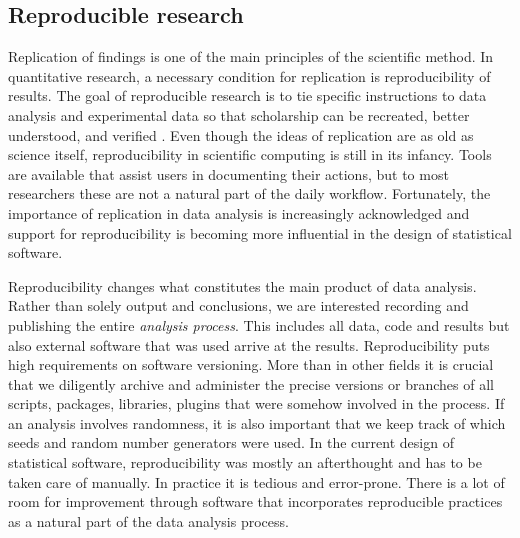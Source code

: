 \subsection{Reproducible research}

Replication of findings is one of the main principles of the scientific method. In quantitative research, a necessary condition for replication is reproducibility of results. The goal of reproducible research is to tie specific instructions to data analysis and experimental data so that scholarship can be recreated, better understood, and verified \citep{cranRR}. Even though the ideas of replication are as old as science itself, reproducibility in scientific computing is still in its infancy. Tools are available that assist users in documenting their actions, but to most researchers these are not a natural part of the daily workflow. Fortunately, the importance of replication in data analysis is increasingly acknowledged and support for reproducibility is becoming more influential in the design of statistical software.

Reproducibility changes what constitutes the main product of data analysis. Rather than solely output and conclusions, we are interested recording and publishing the entire \emph{analysis process}. This includes all data, code and results but also external software that was used arrive at the results. Reproducibility puts high requirements on software versioning. More than in other fields it is crucial that we diligently archive and administer the precise versions or branches of all scripts, packages, libraries, plugins that were somehow involved in the process. If an analysis involves randomness, it is also important that we keep track of which seeds and random number generators were used. In the current design of statistical software, reproducibility was mostly an afterthought and has to be taken care of manually. In practice it is tedious and error-prone. There is a lot of room for improvement through software that incorporates reproducible practices as a natural part of the data analysis process.

